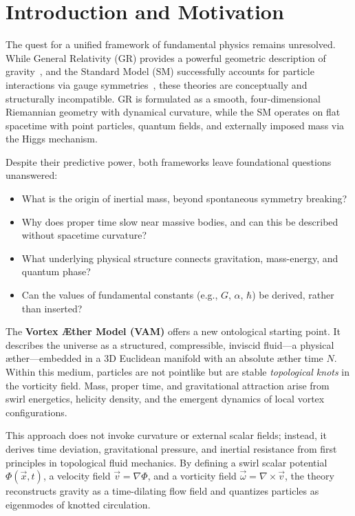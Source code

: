 \documentclass[preprint]{revtex4-2}
\begin{document}
\section{Introduction and Motivation}\label{sec:introduction-and-motivation}
    The quest for a unified framework of fundamental physics remains unresolved. While General Relativity (GR) provides a powerful geometric description of gravity~\cite{einstein1915gr}, and the Standard Model (SM) successfully accounts for particle interactions via gauge symmetries~\cite{weinberg1995quantum}, these theories are conceptually and structurally incompatible. GR is formulated as a smooth, four-dimensional Riemannian geometry with dynamical curvature, while the SM operates on flat spacetime with point particles, quantum fields, and externally imposed mass via the Higgs mechanism.

    Despite their predictive power, both frameworks leave foundational questions unanswered:
    \begin{itemize}
        \item What is the origin of inertial mass, beyond spontaneous symmetry breaking?
        \item Why does proper time slow near massive bodies, and can this be described without spacetime curvature?
        \item What underlying physical structure connects gravitation, mass-energy, and quantum phase?
        \item Can the values of fundamental constants (e.g., $G$, $\alpha$, $\hbar$) be derived, rather than inserted?
    \end{itemize}

    The \textbf{Vortex \AE ther Model (VAM)} offers a new ontological starting point. It describes the universe as a structured, compressible, inviscid fluid---a physical \ae ther---embedded in a 3D Euclidean manifold with an absolute æther time $N$. Within this medium, particles are not pointlike but are stable \textit{topological knots} in the vorticity field. Mass, proper time, and gravitational attraction arise from swirl energetics, helicity density, and the emergent dynamics of local vortex configurations.

    This approach does not invoke curvature or external scalar fields; instead, it derives time deviation, gravitational pressure, and inertial resistance from first principles in topological fluid mechanics. By defining a swirl scalar potential $\Phi(\vec{x},t)$, a velocity field $\vec{v} = \nabla \Phi$, and a vorticity field $\vec{\omega} = \nabla \times \vec{v}$, the theory reconstructs gravity as a time-dilating flow field and quantizes particles as eigenmodes of knotted circulation.
\end{document}
